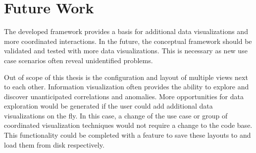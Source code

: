 \section{Future Work}

The developed \cmv{} framework provides a basis for additional data visualizations and more coordinated interactions.
In the future, the conceptual framework should be validated and tested with more data visualizations.
This is necessary as new use case scenarios often reveal unidentified problems.

Out of scope of this thesis is the configuration and layout of multiple views next to each other.
Information visualization often provides the ability to explore and discover unanticipated correlations and anomalies.
More opportunities for data exploration would be generated if the user could add additional data visualizations on the fly.
In this case, a change of the use case or group of coordinated visualization techniques would not require a change to the code base.
This functionality could be completed with a feature to save these layouts to and load them from disk respectively.

